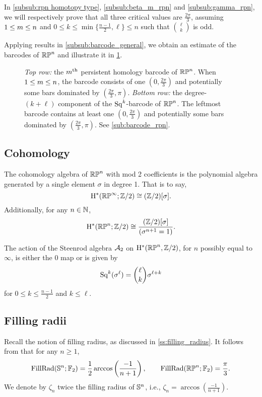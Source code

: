 In \cref{subsub:rpn homotopy type}, \cref{subsub:beta_m_rpn} and \cref{subsub:gamma_rpn}, we will respectively prove that all three critical values are $\frac{2\pi}{3}$, assuming $1 \leq m \leq n$ and $0 \leq k \leq \min\{\frac{n-1}{2}, \ell\} \leq n$ such that $\binom{\ell}{k}$ is odd.

Applying results in \cref{subsub:barcode_general}, we obtain an estimate of the barcodes of $\mathbb{RP}^n$ and illustrate it in \cref{fig:sq barcodes}.

\begin{figure}
	\centering
	
	\caption{\emph{Top row:} the $m^{\mathrm{th}}$ persistent homology barcode of $\mathbb{RP}^n$.
		When $1\leq m \leq n$, the barcode consists of one $(0,\frac{2\pi}{3})$ and potentially some bars dominated by $(\frac{2\pi}{3}, \pi)$.
		\emph{Bottom row:} the degree-$(k+\ell)$ component of the $\operatorname{Sq}^k$-barcode of $\mathbb{RP}^n$.
		The leftmost barcode contains at least one $(0,\frac{2\pi}{3})$ and potentially some bars dominated by $(\frac{2\pi}{3}, \pi)$.
		See \cref{sub:barcode_rpn}.
	}
	\label{fig:sq barcodes}
\end{figure}


\subsection{Cohomology}

The cohomology algebra of $\mathbb{RP}^n$ with mod 2 coefficients is the polynomial algebra generated by a single element $\sigma$ in degree 1.
That is to say,
\[
\mathrm{H}^\ast(\mathbb{RP}^\infty; \mathbb{Z}/2) \cong (\mathbb{Z}/2)[\sigma].
\]
Additionally, for any $n \in \mathbb{N}$,
\[
\mathrm{H}^\ast(\mathbb{RP}^n; \mathbb{Z}/2) \cong \frac{(\mathbb{Z}/2)[\sigma]}{(\sigma^{n+1} = 1)}.
\]

The action of the Steenrod algebra $\mathcal{A}_2$ on $\mathrm{H}^*(\mathbb{RP}^n, \mathbb{Z}/2)$, for $n$ possibly equal to $\infty$, is either the 0 map or is given by
\[
\operatorname{Sq}^k(\sigma^\ell) = \binom{\ell}{k}\sigma^{\ell+k}
\]
for $0 \leq k \leq \frac{n-1}{2}$ and $k \leq \ell$.

\subsection{Filling radii}
\label{sub:filling radius of rpn}
Recall the notion of filling radius, as discussed in \cref{ss:filling_radius}.
It follows from \cite{katz1983filling} that for any $n \geq 1$,
\[
\operatorname{FillRad}(\mathbb{S}^n;{\mathbb{F}_2}) = \frac{1}{2}\arccos\left(\frac{-1}{n+1}\right), \qquad
\operatorname{FillRad}(\mathbb{RP}^n;{\mathbb{F}_2}) = \frac{\pi}{3}.
\]
We denote by $\zeta_n$ twice the filling radius of $\mathbb{S}^n$, i.e., $\zeta_n = \arccos(\frac{-1}{n+1})$.

